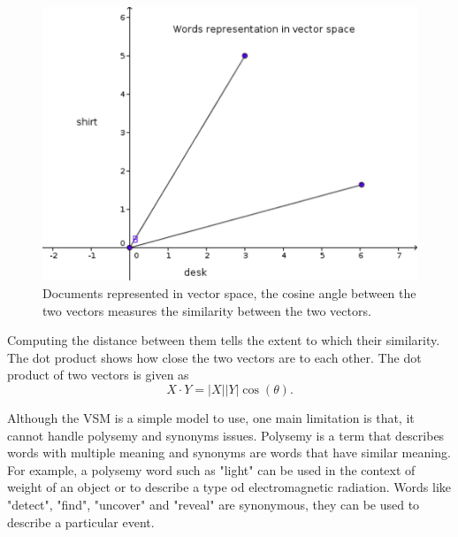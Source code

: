 \begin{figure}[hbtp]
\centering
\includegraphics[scale=0.5]{words_in_vs_orig.png}
\caption{Documents represented in vector space, the  cosine angle between the two vectors measures the similarity between the two vectors.}
\end{figure}
\label{figure 2.1}
Computing the distance between them tells the extent to which their similarity. The dot product shows how close the two vectors are to each other. The dot product of two vectors is given as
$$X\cdot Y=|X||Y|\cos (\theta) \text{.}$$

Although the VSM is a simple model to use, one main limitation is that, it cannot handle polysemy and synonyms issues. Polysemy is a term that describes words with multiple meaning and synonyms are words that have similar meaning.
For example, a polysemy word such as "light" can be used in the context of weight of an object or to describe a type od electromagnetic radiation.
Words like "detect", "find", "uncover" and "reveal" are synonymous, they can be used to describe a particular event.

